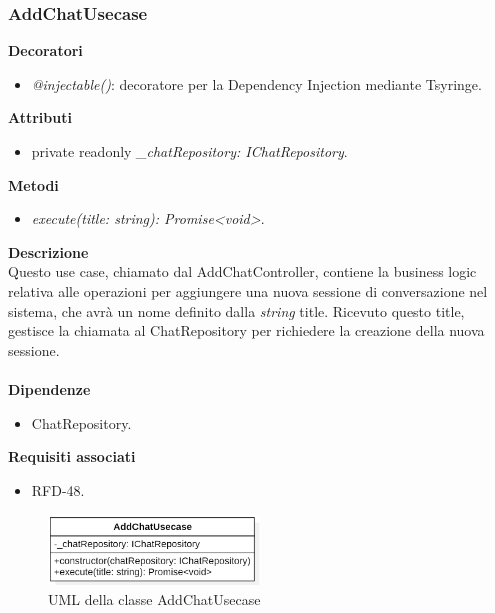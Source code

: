 \subsubsection{AddChatUsecase}
\textbf{Decoratori}
\begin{itemize}
    \item \textit{@injectable()}: decoratore per la Dependency Injection mediante Tsyringe.
\end{itemize}
\textbf{Attributi}
\begin{itemize}
    \item private readonly \textit{\_chatRepository: IChatRepository}.
\end{itemize}
\textbf{Metodi}
\begin{itemize}
    \item \textit{execute(title: string): Promise<void>}.
\end{itemize}
\textbf{Descrizione}\\
Questo use case, chiamato dal AddChatController, contiene la business logic relativa alle operazioni per aggiungere una nuova sessione di conversazione nel sistema, che avrà un nome definito dalla \textit{string} title. Ricevuto questo title, gestisce la chiamata al ChatRepository per richiedere la creazione della nuova sessione.\\ \\
\textbf{Dipendenze}
\begin{itemize}
    \item ChatRepository.
\end{itemize}
\textbf{Requisiti associati}
\begin{itemize}
    \item RFD-48.
\end{itemize}

\begin{figure}[h!]
    \centering  
    \includegraphics[width=0.5\textwidth]{AddChatUsecase.png}
    \caption{UML della classe AddChatUsecase}
\end{figure}

